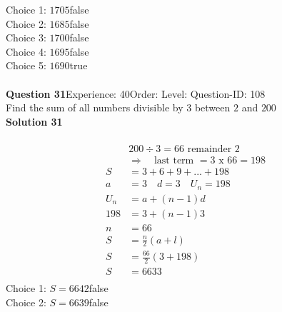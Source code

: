 \documentclass{article}
\begin{document}
Choice 1: \hspace{20pt}$1705$\hspace{20pt}false\\
Choice 2: \hspace{20pt}$1685$\hspace{20pt}false\\
Choice 3: \hspace{20pt}$1700$\hspace{20pt}false\\
Choice 4: \hspace{20pt}$1695$\hspace{20pt}false\\
Choice 5: \hspace{20pt}$1690$\hspace{20pt}true\\
\\[4pt]
\noindent\textbf{Question 31}\hspace{20pt}Experience: 40\hspace{20pt}Order: \hspace{20pt}Level: \hspace{20pt}Question-ID: 108\\[2pt]
Find the sum of all numbers divisible by 3 between $2$ and $200$\\[4pt]
\noindent\textbf{Solution 31}\\[2pt]
\\[-35pt]\begin{align*}
&200 \div 3 = 66 \,\, \text{remainder}\,\, 2\\[2pt]
&\Rightarrow \quad \text{last term }= 3 \,\,\text{x}\,\, 66=198\\[2pt]
S&=3+6+9+...+198\\[12pt]
a&=3\quad d=3 \quad U_n=198\\[2pt]
U_n&=a+(n-1)d\\[2pt]
198&=3+(n-1)3\\[2pt]
n&=66\\[12pt]
S&=\displaystyle\frac{n}{2}(a+l)\\[2pt]
S&=\displaystyle\frac{66}{2}(3+198)\\[2pt]
S&=6633\\
\end{align*}
Choice 1: \hspace{20pt}$S=6642$\hspace{20pt}false\\
Choice 2: \hspace{20pt}$S=6639$\hspace{20pt}false\\
\end{document}

